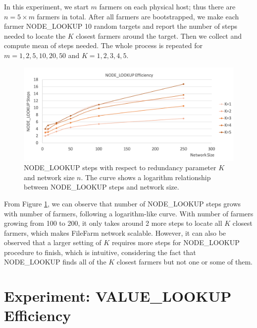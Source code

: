 In this experiment, we start $m$ farmers on each physical host; thus there are $n = 5 \times m$ farmers in total. After all farmers are bootstrapped, we make each farmer NODE\_LOOKUP 10 random targets and report the number of steps needed to locate the $K$ closest farmers around the target. Then we collect and compute mean of steps needed. The whole process is repeated for $m=1,2,5,10,20,50$ and $K=1,2,3,4,5$.

\begin{figure}[hbt]
\centering
  \includegraphics[width=14cm]{charts/chart_node_lookup_efficiency.png}
  \caption[NODE\_LOOKUP steps with respect to $K$ and network size $n$]{NODE\_LOOKUP steps with respect to redundancy parameter $K$ and network size $n$. The curve shows a logarithm relationship between NODE\_LOOKUP steps and network size.}
  \label{fig:nodelookupefficiency}
\end{figure}

From Figure \ref{fig:nodelookupefficiency}, we can observe that number of NODE\_LOOKUP steps grows with number of farmers, following a logarithm-like curve. With number of farmers growing from 100 to 200, it only takes around 2 more steps to locate all $K$ closest farmers, which makes FileFarm network scalable. However, it can also be observed that a larger setting of $K$ requires more steps for NODE\_LOOKUP procedure to finish, which is intuitive, considering the fact that NODE\_LOOKUP finds all of the $K$ closest farmers but not one or some of them.


\section{Experiment: VALUE\_LOOKUP Efficiency}
\label{s:expvaluelookupefficiency}

